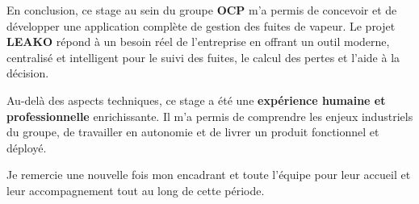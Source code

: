 \documentclass[12pt,a4paper,oneside]{report}
\begin{document}
En conclusion, ce stage au sein du groupe \textbf{OCP} m'a permis de concevoir et de développer une application complète de gestion des fuites de vapeur. Le projet \textbf{LEAKO} répond à un besoin réel de l'entreprise en offrant un outil moderne, centralisé et intelligent pour le suivi des fuites, le calcul des pertes et l'aide à la décision.

Au-delà des aspects techniques, ce stage a été une \textbf{expérience humaine et professionnelle} enrichissante. Il m'a permis de comprendre les enjeux industriels du groupe, de travailler en autonomie et de livrer un produit fonctionnel et déployé.

Je remercie une nouvelle fois mon encadrant et toute l'équipe pour leur accueil et leur accompagnement tout au long de cette période.
\end{document}
